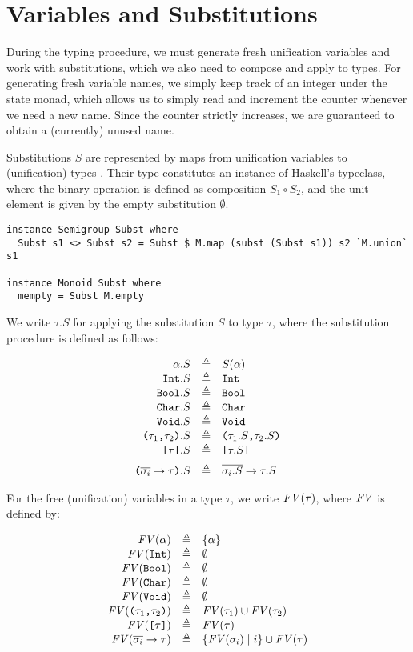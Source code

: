 \section{Variables and Substitutions}

During the typing procedure, we must generate fresh unification variables and
work with substitutions, which we also need to compose and apply to types.
For generating fresh variable names, we simply keep track of an integer
 under the state monad, which allows us to simply read and
increment the counter whenever we need a new name. Since the counter strictly
increases, we are guaranteed to obtain a (currently) unused name.

Substitutions $S$ are represented by maps from unification variables
 to (unification) types . Their type 
constitutes an instance of Haskell's  typeclass, where the
binary operation is defined as composition $S_1 \circ S_2$, and the unit element
is given by the empty substitution $\emptyset$.

\begin{verbatim}
instance Semigroup Subst where
  Subst s1 <> Subst s2 = Subst $ M.map (subst (Subst s1)) s2 `M.union` s1

instance Monoid Subst where
  mempty = Subst M.empty
\end{verbatim}

We write $\tau.S$ for applying the substitution $S$ to type $\tau$, where the
substitution procedure is defined as follows:

\[
\begin{array}{rcl}
  \alpha.S & \eqdef & S(\alpha) \\
  \Int.S & \eqdef & \Int \\
  \Bool.S & \eqdef & \Bool \\
  \Char.S & \eqdef & \Char \\
  \Void.S & \eqdef & \Void \\
  \TProd{\tau_1}{\tau_2}.S & \eqdef & \TProd{\tau_1.S}{\tau_2.S} \\
  \TList{\tau}.S & \eqdef & \TList{\tau.S} \br
  \Parens{ \TFun{\set{\sigma_i}}{\tau} }.S & \eqdef & \TFun{\set{\sigma_i.S}}{\tau.S}
\end{array}
\]

For the free (unification) variables in a type $\tau$, we write $\mathit{FV}(\tau)$, where
$\mathit{FV}$ is defined by:

\[
\begin{array}{rcl}
  \mathit{FV}(\alpha) & \triangleq & \{ \alpha \} \\
  \mathit{FV}(\texttt{Int}) & \triangleq & \emptyset \\
  \mathit{FV}(\texttt{Bool}) & \triangleq & \emptyset \\
  \mathit{FV}(\texttt{Char}) & \triangleq & \emptyset \\
  \mathit{FV}(\texttt{Void}) & \triangleq & \emptyset \\
  \mathit{FV}( \texttt{(}\tau_1\texttt{,}\tau_2\texttt{)} ) & \triangleq & \mathit{FV}(\tau_1) \cup \mathit{FV}(\tau_2) \\
  \mathit{FV}( \texttt{[}\tau\texttt{]} ) & \triangleq & \mathit{FV}(\tau) \\
  \mathit{FV}( \overline{\sigma_i} \to \tau ) & \triangleq & \{ \mathit{FV}(\sigma_i) \mid i \} \cup \mathit{FV}(\tau)
\end{array}
\]

